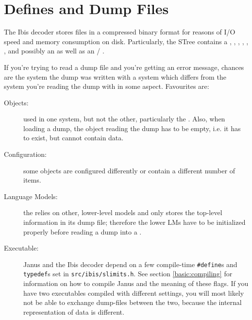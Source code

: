 \section{Defines and Dump Files} \label{trouble:dumps}

The  Ibis decoder  stores  files in  a   compressed binary format  for
reasons of I/O speed and memory consumption on disk. Particularly, the
STree     contains   a    ,
,                       ,
,  , ,
and      possibly  an          as  well  as    an
/ .

If  you're trying to   read a dump file  and  you're getting  an error
message, chances are the  system the  dump was  written with  a system
which differs from  the system you're reading  the  dump with  in some
aspect. Favourites are:

\begin{description}

\item[Objects:] used  in one system, but   not the other, particularly
the  . Also,  when  loading  a dump,  the  object
reading the dump has  to be empty, i.e. it   has to exist, but  cannot
contain data.

\item[Configuration:]  some objects   are  configured differently   or
contain a different number of items.

\item[Language Models:]   the   relies  on other,
lower-level models and  only  stores the top-level information  in its
dump file; therefore the  lower LMs  have  to be  initialized properly
before reading a dump into a .

\item[Executable:]  Janus and    the Ibis decoder  depend  on    a few
compile-time   \texttt{\#define}s  and    \texttt{typedef}s   set   in
\texttt{src/ibis/slimits.h}.  See section \ref{basic:compiling}    for
information on how to compile Janus and the meaning of these flags. If
you have  two executables compiled  with different settings,  you will
most likely  not be   able to exchange  dump-files between    the two,
because the internal representation of data is different.

\end{description}


